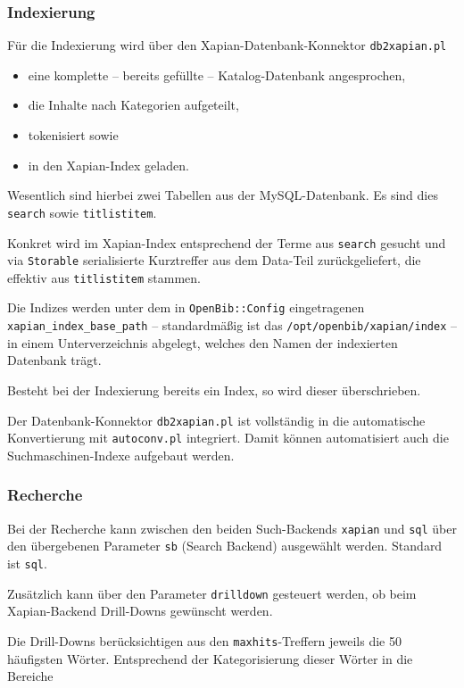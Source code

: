\documentclass[11pt, twoside, a4paper, BCOR8mm, DIV12, bibtotoc,idxtotoc]{scrbook}
\begin{document}
\subsubsection{Indexierung}

Für die Indexierung wird über den Xapian-Datenbank-Konnektor
\texttt{db2xapian.pl} 

\begin{itemize}
\item eine komplette -- bereits gefüllte -- Katalog-Datenbank angesprochen,
\item die Inhalte nach Kategorien aufgeteilt,
\item tokenisiert sowie
\item in den Xapian-Index geladen.
\end{itemize}

Wesentlich sind hierbei zwei Tabellen aus der MySQL-Datenbank. Es sind
dies \texttt{search} sowie \texttt{titlistitem}.

Konkret wird im Xapian-Index entsprechend der Terme aus
\texttt{search} gesucht und via \texttt{Storable} serialisierte
Kurztreffer aus dem Data-Teil zurückgeliefert, die effektiv aus
\texttt{titlistitem} stammen.

Die Indizes werden unter dem in \texttt{OpenBib::Config} eingetragenen
\texttt{xapian\_index\_base\_path} -- standardmäßig ist das
\texttt{/opt/openbib/xapian/index} -- in einem Unterverzeichnis
abgelegt, welches den Namen der indexierten Datenbank trägt.

Besteht bei der Indexierung bereits ein Index, so wird dieser
überschrieben.

Der Datenbank-Konnektor \texttt{db2xapian.pl} ist vollständig in die
automatische Konvertierung mit \texttt{autoconv.pl} integriert. Damit
können automatisiert auch die Suchmaschinen-Indexe aufgebaut werden.

\subsubsection{Recherche}

Bei der Recherche kann zwischen den beiden Such-Backends
\texttt{xapian} und \texttt{sql} über den übergebenen Parameter
\texttt{sb} (Search Backend) ausgewählt werden. Standard ist
\texttt{sql}.

Zusätzlich kann über den Parameter \texttt{drilldown} gesteuert
werden, ob beim Xapian-Backend Drill-Downs gewünscht werden.

Die Drill-Downs berücksichtigen aus den \texttt{maxhits}-Treffern
jeweils die 50 häufigsten Wörter. Entsprechend der Kategorisierung
dieser Wörter in die Bereiche
\end{document}
